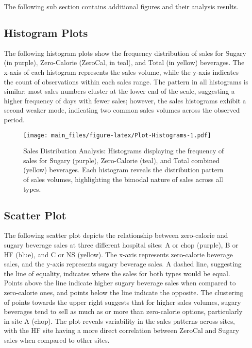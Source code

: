 \documentclass[
]{article}
\begin{document}
The following sub section contains additional figures and their analysis results.

\hypertarget{histogram-plots}{%
\subsection{Histogram Plots}\label{histogram-plots}}

The following histogram plots show the frequency distribution of sales for Sugary (in purple), Zero-Calorie (ZeroCal, in teal), and Total (in yellow) beverages. The x-axis of each histogram represents the sales volume, while the y-axis indicates the count of observations within each sales range. The pattern in all histograms is similar: most sales numbers cluster at the lower end of the scale, suggesting a higher frequency of days with fewer sales; however, the sales histograms exhibit a second weaker mode, indicating two common sales volumes across the observed period.

\begin{figure}
\centering
\texttt{[image: main\_files/figure-latex/Plot-Histograms-1.pdf]}
\caption{\label{fig:Plot-Histograms}Sales Distribution Analysis: Histograms displaying the frequency of sales for Sugary (purple), Zero-Calorie (teal), and Total combined (yellow) beverages. Each histogram reveals the distribution pattern of sales volumes, highlighting the bimodal nature of sales across all types.}
\end{figure}

\hypertarget{scatter-plot}{%
\subsection{Scatter Plot}\label{scatter-plot}}

The following scatter plot depicts the relationship between zero-calorie and sugary beverage sales at three different hospital sites: A or chop (purple), B or HF (blue), and C or NS (yellow). The x-axis represents zero-calorie beverage sales, and the y-axis represents sugary beverage sales. A dashed line, suggesting the line of equality, indicates where the sales for both types would be equal. Points above the line indicate higher sugary beverage sales when compared to zero-calorie ones, and points below the line indicate the opposite. The clustering of points towards the upper right suggests that for higher sales volumes, sugary beverages tend to sell as much as or more than zero-calorie options, particularly in site A (chop). The plot reveals variability in the sales patterns across sites, with the HF site having a more direct correlation between ZeroCal and Sugary sales when compared to other sites.
\end{document}
